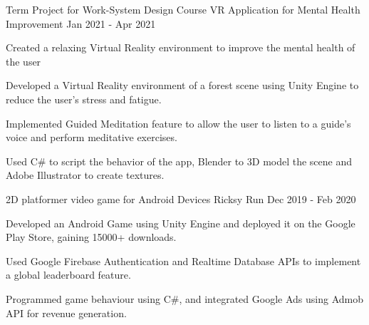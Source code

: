\begin{cventries}
  \cventry
    {Term Project for Work-System Design Course} %
    {VR Application for Mental Health Improvement} %
    {Jan 2021 - Apr 2021} %
    {} %
    {
      \begin{cvitems} %
        \item {Created a relaxing Virtual Reality environment to improve the mental health of the user}
        \item {Developed a Virtual Reality environment of a forest scene using Unity Engine to reduce the user's stress and fatigue.}
        \item {Implemented Guided Meditation feature to allow the user to listen to a guide's voice and perform meditative exercises.}
        \item {Used C# to script the behavior of the app, Blender to 3D model the scene and Adobe Illustrator to create textures.}
      \end{cvitems}
    }
    
  \cventry
    {2D platformer video game for Android Devices} %
    {Ricksy Run} %
    {Dec 2019 - Feb 2020} %
    {} %
    {
      \begin{cvitems} %
        \item {Developed an Android Game using Unity Engine and deployed it on the Google Play Store, gaining 15000+ downloads.}
        \item {Used Google Firebase Authentication and Realtime Database APIs to implement a global leaderboard feature.}
        \item {Programmed game behaviour using C#, and integrated Google Ads using Admob API for revenue generation.}
      \end{cvitems}
    }

\end{cventries}
